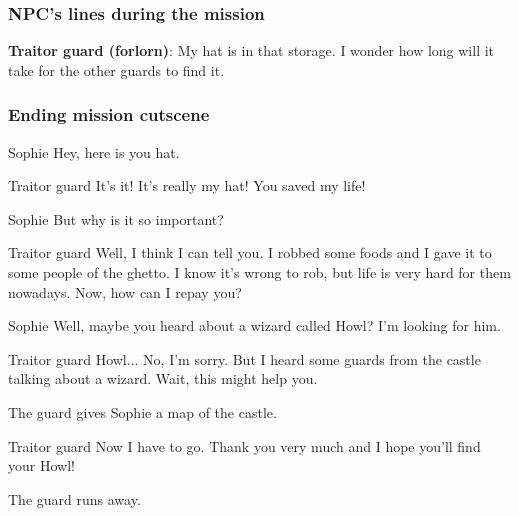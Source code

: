 \subsubsection*{NPC's lines during the mission}
\textbf{Traitor guard (forlorn)}: My hat is in that storage. I wonder how long will it take for the other guards to find it.

\subsubsection*{Ending mission cutscene}
\begin{screenplay}

\begin{dialogue}{Sophie}
Hey, here is you hat.
\end{dialogue}

\begin{dialogue}[surprised]{Traitor guard}
It's it! It's really my hat! You saved my life!
\end{dialogue}

\begin{dialogue}{Sophie}
But why is it so important?
\end{dialogue}

\begin{dialogue}{Traitor guard}
Well, I think I can tell you. I robbed some foods and I gave it to some people of the ghetto. I know it's wrong to rob, but life is very hard for them nowadays. Now, how can I repay you?
\end{dialogue}

\begin{dialogue}{Sophie}
Well, maybe you heard about a wizard called Howl? I'm looking for him.
\end{dialogue}

\begin{dialogue}[thinking]{Traitor guard}
Howl... No, I'm sorry. But I heard some guards from the castle talking about a wizard. Wait, this might help you.
\end{dialogue}

The guard gives Sophie a map of the castle.

\begin{dialogue}[continuing]{Traitor guard}
Now I have to go. Thank you very much and I hope you'll find your Howl!
\end{dialogue}

The guard runs away.

\end{screenplay}


